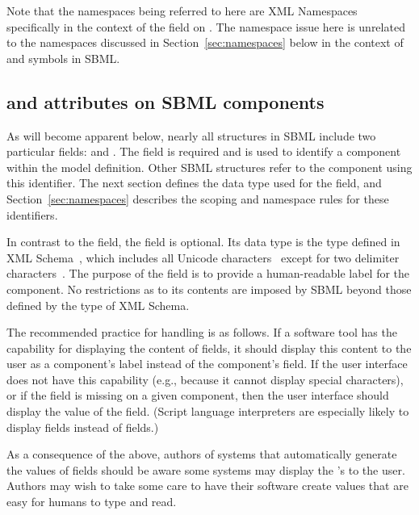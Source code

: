 \documentclass[10pt,twocolumntoc]{cekarticle}
\begin{document}
Note that the namespaces being referred to here are XML Namespaces
specifically in the context of the  field on
.  The namespace issue here is unrelated to the namespaces
discussed in Section~\ref{sec:namespaces} below in the context of
 and symbols in SBML.

\subsection{ and  attributes on SBML components}
\label{sec:idnameattribs}

As will become apparent below, nearly all structures in SBML include two
particular fields:  and .  The  field is
required and is used to identify a component within the model definition.
Other SBML structures refer to the component using this identifier.  The
next section defines the data type  used for the 
field, and Section~\ref{sec:namespaces} describes the scoping and namespace
rules for these identifiers.

In contrast to the  field, the  field is optional.
Its data type is the type  defined in XML
Schema~\citep{biron:2000,thompson:2000}, which includes all Unicode
characters~\citep{unicode:1996} except for two delimiter
characters~\citep{biron:2000}.  The purpose of the  field is
to provide a human-readable label for the component.  No restrictions as to
its contents are imposed by SBML beyond those defined by the 
type of XML Schema.

The recommended practice for handling  is as follows.  If a
software tool has the capability for displaying the content of
 fields, it should display this content to the user as a
component's label instead of the component's  field.  If the
user interface does not have this capability (e.g., because it cannot
display special characters), or if the  field is missing on a
given component, then the user interface should display the value of the
 field.  (Script language interpreters are especially likely to
display  fields instead of  fields.)

As a consequence of the above, authors of systems that automatically
generate the values of  fields should be aware some systems may
display the 's to the user.  Authors may wish to take some care
to have their software create  values that are easy for humans
to type and read.
\end{document}
